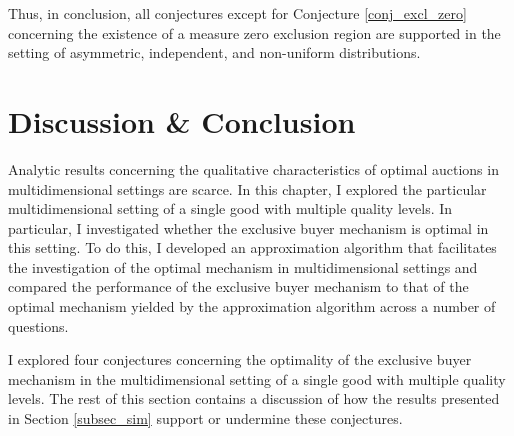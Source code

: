 \documentclass{article}
\newcounter{fig}
\begin{document}



  

Thus, in conclusion, all conjectures except for Conjecture \ref{conj_excl_zero} concerning the existence of a measure zero exclusion region are supported in the setting of asymmetric, independent, and non-uniform distributions.




\section{Discussion \& Conclusion}\label{sec_discuss}

Analytic results concerning the qualitative characteristics of optimal auctions in multidimensional settings are scarce. In this chapter, I explored the particular multidimensional setting of a single good with multiple quality levels. In particular, I investigated whether the exclusive buyer mechanism is optimal in this setting. To do this, I developed an approximation algorithm that facilitates the investigation of the optimal mechanism in multidimensional settings and compared the performance of the exclusive buyer mechanism to that of the optimal mechanism yielded by the approximation algorithm across a number of questions. 

I explored four conjectures concerning the optimality of the exclusive buyer mechanism in the multidimensional setting of a single good with multiple quality levels. The rest of this section contains a discussion of how the results presented in Section \ref{subsec_sim} support or undermine these conjectures.
\end{document}
